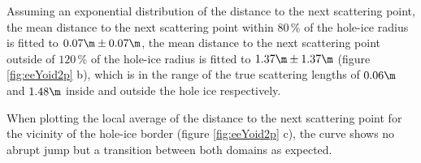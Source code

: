 Assuming an exponential distribution of the distance to the next scattering point, the mean distance to the next scattering point within $80\,\%$ of the hole-ice radius is fitted to $0.07\m \pm 0.07\m$, the mean distance to the next scattering point outside of $120\,\%$ of the hole-ice radius is fitted to $1.37\m\pm 1.37\m$ (figure \ref{fig:eeYoid2p} b), which is in the range of the true scattering lengths of $0.06\m$ and $1.48\m$ inside and outside the hole ice respectively.

When plotting the local average of the distance to the next scattering point for the vicinity of the hole-ice border (figure \ref{fig:eeYoid2p} c), the curve shows no abrupt jump but a transition between both domains as expected.

